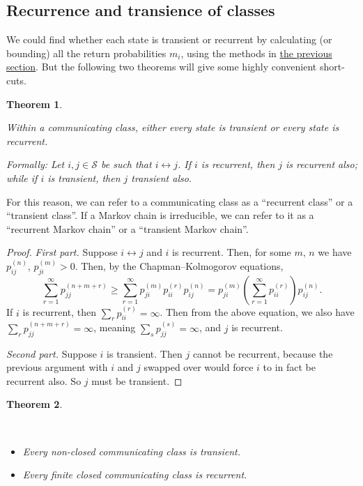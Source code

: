 \documentclass[
  a4paper,
]{article}
\providecommand{\tightlist}{%
  \setlength{\itemsep}{0pt}\setlength{\parskip}{0pt}}
\newtheorem{theorem}{Theorem}[section]
\theoremstyle{definition}
\theoremstyle{definition}
\theoremstyle{definition}
\theoremstyle{remark}
\begin{document}
\hypertarget{rec-tran-classes}{%
\subsection{Recurrence and transience of classes}\label{rec-tran-classes}}

We could find whether each state is transient or recurrent by calculating (or bounding) all the return probabilities \(m_i\), using the methods in \protect\hyperlink{S08-hitting-times}{the previous section}. But the following two theorems will give some highly convenient short-cuts.

\begin{theorem}
\protect\hypertarget{thm:unlabeled-div-5}{}\label{thm:unlabeled-div-5}

Within a communicating class, either every state is transient or every state is recurrent.

Formally: Let \(i, j \in \mathcal S\) be such that \(i \leftrightarrow j\). If \(i\) is recurrent, then \(j\) is recurrent also; while if \(i\) is transient, then \(j\) transient also.

\end{theorem}

For this reason, we can refer to a communicating class as a ``recurrent class'' or a ``transient class''. If a Markov chain is irreducible, we can refer to it as a ``recurrent Markov chain'' or a ``transient Markov chain''.

\begin{proof}

\emph{First part.} Suppose \(i \leftrightarrow j\) and \(i\) is recurrent. Then, for some \(m\), \(n\) we have \(p_{ij}^{(n)}\), \(p_{ji}^{(m)} > 0\). Then, by the Chapman--Kolmogorov equations,
\[ \sum_{r=1}^\infty p_{jj}^{(n+m+r)} \geq \sum_{r=1}^\infty p_{ji}^{(m)}p_{ii}^{(r)} p_{ij}^{(n)} = p_{ji}^{(m)} \left(\sum_{r=1}^\infty p_{ii}^{(r)} \right) p_{ij}^{(n)} .   \]
If \(i\) is recurrent, then \(\sum_r p_{ii}^{(r)} = \infty\). Then from the above equation, we also have \(\sum_r p_{jj}^{(n+m+r)} = \infty\), meaning \(\sum_s p_{jj}^{(s)} = \infty\), and \(j\) is recurrent.

\emph{Second part.} Suppose \(i\) is transient. Then \(j\) cannot be recurrent, because the previous argument with \(i\) and \(j\) swapped over would force \(i\) to in fact be recurrent also. So \(j\) must be transient.

\end{proof}

\begin{theorem}
\protect\hypertarget{thm:unlabeled-div-7}{}\label{thm:unlabeled-div-7}

~

\begin{itemize}
\tightlist
\item
  Every non-closed communicating class is transient.
\item
  Every finite closed communicating class is recurrent.
\end{itemize}

\end{theorem}
\end{document}
